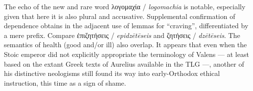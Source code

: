 \noindent{}The echo of the new and rare word λογομαχία / \textit{logomachia} is notable, %
especially given that here it is also plural and accusative. %
Supplemental confirmation of dependence obtains in the adjacent use of lemmas %
for “craving”, differentiated by a mere prefix. Compare ἐπιζητήσεις / \textit{epidzētēseis} %
and ζητήσεις / \textit{dzētēseis}. %
The semantics of health (good and/or ill) also overlap. %
It appears that even when the Stoic emperor did not explicitly appropriate the terminology %
of Valens --- at least based on the extant Greek texts of Aurelius available in the TLG ---, %
another of his distinctive neologisms still found its way %
into early-Orthodox ethical instruction, this time as a sign of shame. %